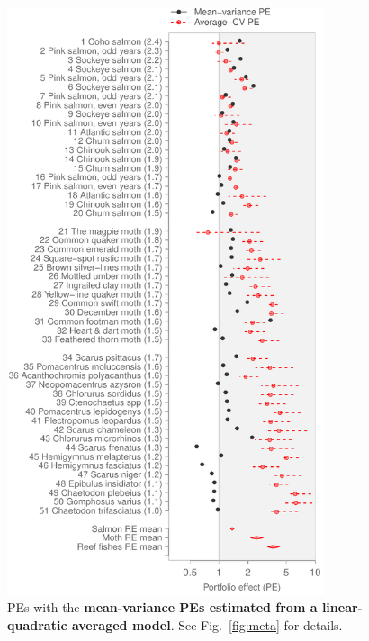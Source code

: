 \begin{figure}[htbp]
  \centering
  \includegraphics[height=6.8in]{prophets/PE_comparison_z_meta_taxa_lin_quad_avg_20121214.pdf}
  \caption{PEs with the \textbf{mean-variance PEs estimated from a
      linear-quadratic averaged model}. See Fig.~\ref{fig:meta} for details.}
\label{fig:meta-lin-quad-avg}
\end{figure}

